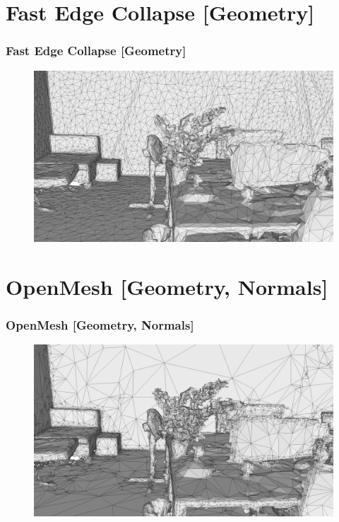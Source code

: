 \documentclass[
	10pt,
	t		%
]{beamer}
\begin{document}
\section{Fast Edge Collapse [Geometry]}
\begin{frame}
\frametitle{Fast Edge Collapse [Geometry]}
\begin{figure}[ht]
\centering
\includegraphics[width=1\textwidth]{fast_collapse}
\end{figure}
\end{frame}

\section{OpenMesh [Geometry, Normals]}
\begin{frame}
\frametitle{OpenMesh [Geometry, Normals]}
\begin{figure}[ht]
\centering
\includegraphics[width=1\textwidth]{open_mesh}
\end{figure}
\end{frame}
\end{document}
